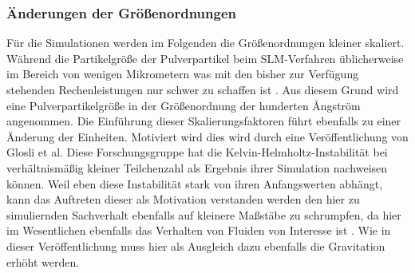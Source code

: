 		\subsubsection{Änderungen der Größenordnungen}
		Für die Simulationen werden im Folgenden die Größenordnungen kleiner skaliert. Während die
		Partikelgröße der Pulverpartikel beim SLM-Verfahren üblicherweise im Bereich von wenigen
		Mikrometern \cite{hajnys2020research} was mit den bisher zur Verfügung stehenden
		Rechenleistungen nur schwer zu schaffen ist \cite{eckhardt2013scientists}. Aus diesem
		Grund wird eine Pulverpartikelgröße in der Größenordnung der hunderten \AA ngström
		angenommen. Die Einführung dieser Skalierungsfaktoren führt ebenfalls zu einer Änderung
		der Einheiten. Motiviert wird dies wird durch eine Veröffentlichung von Glosli et al.
		Diese Forschungsgruppe hat die Kelvin-Helmholtz-Instabilität bei verhältnismäßig kleiner
		Teilchenzahl als Ergebnis ihrer Simulation nachweisen können. Weil eben diese Instabilität
		stark von ihren Anfangswerten abhängt, kann das Auftreten dieser als Motivation verstanden
		werden den hier zu simuliernden Sachverhalt ebenfalls auf kleinere Maßstäbe zu schrumpfen,
		da hier im Wesentlichen ebenfalls das Verhalten von Fluiden von Interesse ist
		\cite{glosli2007extending}. Wie in dieser Veröffentlichung muss hier als Ausgleich dazu
		ebenfalls die Gravitation erhöht werden.

